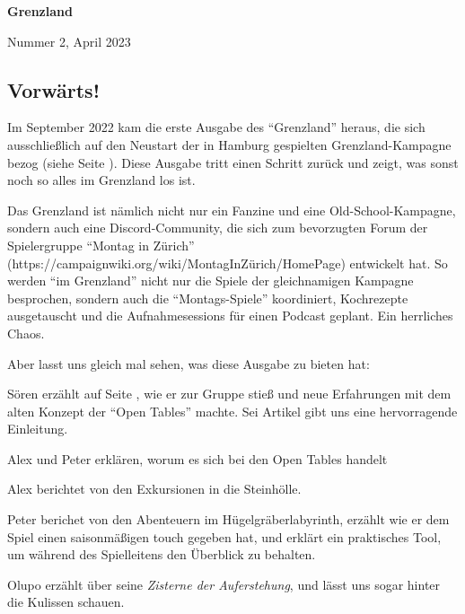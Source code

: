 \documentclass[11pt]{wbzine}
\begin{document}


\shipout\null
\addtocounter{page}{-1}

{\bfseries\fontsize{70}{55}
 \selectfont Grenzland \par}%
 \hrulefill
 Nummer 2, April 2023

\tableofcontents

\begin{multicols}{2}

\section{Vorwärts!}

Im September 2022 kam die erste Ausgabe des ``Grenzland'' heraus,
    die sich ausschließlich auf den Neustart der in Hamburg
    gespielten Grenzland-Kampagne
    bezog (siehe Seite \pageref{grenzland-reloaded}). Diese Ausgabe
    tritt einen Schritt zurück und zeigt, was sonst noch so alles im
    Grenzland los ist.

Das Grenzland ist nämlich nicht nur ein Fanzine und eine
    Old-School-Kampagne, sondern auch eine Discord-Community, die
    sich zum bevorzugten Forum der Spielergruppe ``Montag in
    Zürich'' (https://campaignwiki.org/wiki/MontagInZürich/HomePage)
    entwickelt hat. So werden ``im Grenzland'' nicht nur die Spiele
    der gleichnamigen Kampagne besprochen, sondern auch die
    ``Montags-Spiele'' koordiniert, Kochrezepte ausgetauscht und die
    Aufnahmesessions für einen Podcast geplant. Ein herrliches
    Chaos. 

    Aber lasst uns gleich mal sehen, was diese Ausgabe zu bieten
    hat:

    Sören erzählt auf Seite \pageref{altes-konzept}, wie er zur
    Gruppe stieß und neue Erfahrungen mit dem alten Konzept der
    ``Open Tables'' machte. Sei Artikel gibt uns 
    eine hervorragende Einleitung.

Alex und Peter erklären, worum es sich bei den Open Tables handelt

Alex berichtet von den Exkursionen in die Steinhölle.

Peter berichet von den Abenteuern im Hügelgräberlabyrinth, erzählt
wie er dem Spiel einen saisonmäßigen touch gegeben hat, und
erklärt ein praktisches Tool, um während des Spielleitens den
Überblick zu behalten.

Olupo erzählt über seine \textit{Zisterne der Auferstehung}, und
lässt uns sogar hinter die Kulissen schauen.




\end{multicols}
\end{document}
